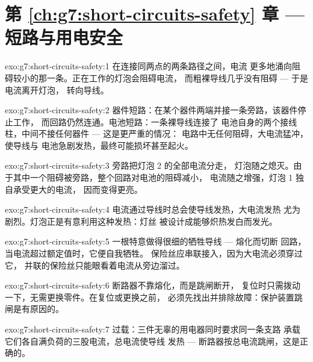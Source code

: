 \section*{第 \ref{ch:g7:short-circuits-safety} 章 --- 短路与用电安全}

\begin{solution}{exo:g7:short-circuits-safety:1}
在连接同两点的两条路径之间，电流
更多地涌向阻碍较小的那一条。正在工作的灯泡会阻碍电流，
而粗裸导线几乎没有阻碍 --- 于是电流离开灯泡，
转向导线。
\end{solution}

\begin{solution}{exo:g7:short-circuits-safety:2}
器件短路：在某个器件两端并接一条旁路，该器件停止工作，
而回路仍然连通。电池短路：一条裸导线连接了
电池自身的两个接线柱，中间不接任何器件 --- 这是更严重的情况：
电路中无任何阻碍，大电流猛冲，使导线与
电池急剧发热，最终可能损坏甚至起火。
\end{solution}

\begin{solution}{exo:g7:short-circuits-safety:3}
旁路把灯泡 2 的全部电流分走，
灯泡随之熄灭。由于其中一个阻碍被旁路，整个回路对电池的阻碍减小，
电流随之增强，灯泡 1 独自承受更大的电流，
因而变得更亮。
\end{solution}

\begin{solution}{exo:g7:short-circuits-safety:4}
电流通过导线时总会使导线发热，大电流发热
尤为剧烈。灯泡正是有意利用这种发热：灯丝
被设计成能够炽热发白而发光。
\end{solution}

\begin{solution}{exo:g7:short-circuits-safety:5}
一根特意做得很细的牺牲导线 --- 熔化而切断
回路，当电流超过额定值时，它便自我牺牲。
保险丝应串联接入，因为大电流必须穿过它，
并联的保险丝只能眼看着电流从旁边溜过。
\end{solution}

\begin{solution}{exo:g7:short-circuits-safety:6}
断路器不靠熔化，而是跳闸断开，
复位时只需拨动一下，无需更换零件。在复位或更换之前，
必须先找出并排除故障：保护装置跳闸是有原因的。
\end{solution}

\begin{solution}{exo:g7:short-circuits-safety:7}
过载：三件无辜的用电器同时要求同一条支路
承载它们各自满负荷的三股电流，总电流使导线
发热 --- 断路器按总电流跳闸，这是正确的。
\end{solution}

